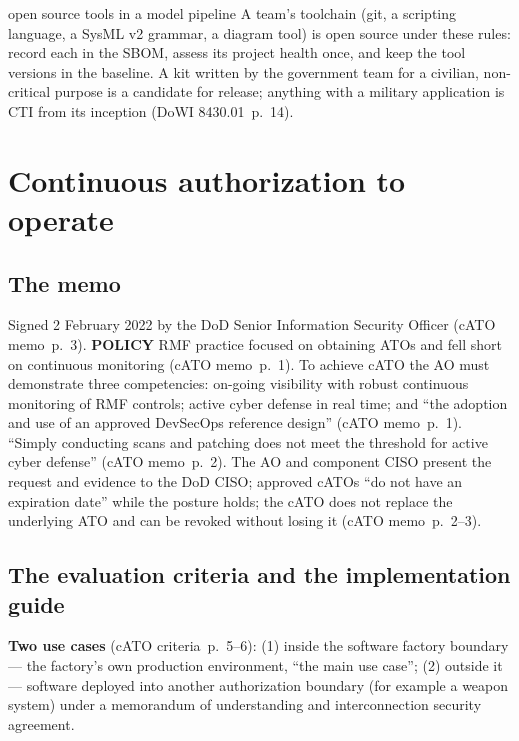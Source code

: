\documentclass[11pt,letterpaper,twoside,openany]{memoir}
\newcommand{\pg}[2]{{\small(#1~p.~#2)}}          %
\newcommand{\st}[1]{{\sffamily\scriptsize\bfseries #1}}   %
\begin{document}
\begin{boxteam}{open source tools in a model pipeline}
A team's toolchain (git, a scripting language, a SysML v2 grammar, a diagram tool) is open source under these rules:
record each in the SBOM, assess its project health once, and keep the tool versions in the baseline. A kit written by
the government team for a civilian, non-critical purpose is a candidate for release; anything with a military
application is CTI from its inception \pg{DoWI 8430.01}{14}.
\end{boxteam}

\chapter{Continuous authorization to operate}\label{ch:cato}

\section{The memo}
Signed 2 February 2022 by the DoD Senior Information Security Officer \pg{cATO memo}{3}. \st{POLICY} RMF practice focused
on obtaining ATOs and fell short on continuous monitoring \pg{cATO memo}{1}. To achieve cATO the AO must demonstrate three
competencies: on-going visibility with robust continuous monitoring of RMF controls; active cyber defense in real time;
and ``the adoption and use of an approved DevSecOps reference design'' \pg{cATO memo}{1}. ``Simply conducting scans and
patching does not meet the threshold for active cyber defense'' \pg{cATO memo}{2}. The AO and component CISO present
the request and evidence to the DoD CISO; approved cATOs ``do not have an expiration date'' while the posture holds;
the cATO does not replace the underlying ATO and can be revoked without losing it \pg{cATO memo}{2--3}.

\section{The evaluation criteria and the implementation guide}
\textbf{Two use cases} \pg{cATO criteria}{5--6}: (1) inside the software factory boundary --- the factory's own
production environment, ``the main use case''; (2) outside it --- software deployed into another authorization
boundary (for example a weapon system) under a memorandum of understanding and interconnection security agreement.
\end{document}
